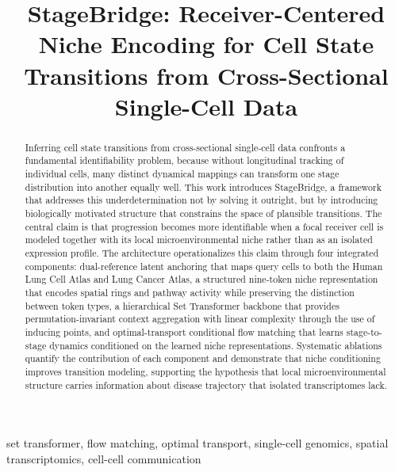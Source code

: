 \documentclass[conference]{IEEEtran}
\begin{document}
\pagestyle{plain}

\title{StageBridge: Receiver-Centered Niche Encoding for Cell State Transitions from Cross-Sectional Single-Cell Data}

\author{
}

\maketitle

\begin{abstract}
Inferring cell state transitions from cross-sectional single-cell data confronts a fundamental identifiability problem, because without longitudinal tracking of individual cells, many distinct dynamical mappings can transform one stage distribution into another equally well. This work introduces StageBridge, a framework that addresses this underdetermination not by solving it outright, but by introducing biologically motivated structure that constrains the space of plausible transitions. The central claim is that progression becomes more identifiable when a focal receiver cell is modeled together with its local microenvironmental niche rather than as an isolated expression profile. The architecture operationalizes this claim through four integrated components: dual-reference latent anchoring that maps query cells to both the Human Lung Cell Atlas and Lung Cancer Atlas, a structured nine-token niche representation that encodes spatial rings and pathway activity while preserving the distinction between token types, a hierarchical Set Transformer backbone that provides permutation-invariant context aggregation with linear complexity through the use of inducing points, and optimal-transport conditional flow matching that learns stage-to-stage dynamics conditioned on the learned niche representations. Systematic ablations quantify the contribution of each component and demonstrate that niche conditioning improves transition modeling, supporting the hypothesis that local microenvironmental structure carries information about disease trajectory that isolated transcriptomes lack.
\end{abstract}

\begin{IEEEkeywords}
set transformer, flow matching, optimal transport, single-cell genomics, spatial transcriptomics, cell-cell communication
\end{IEEEkeywords}
\end{document}
